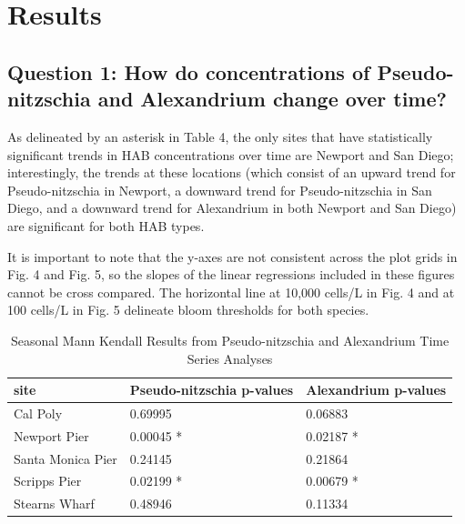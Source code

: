 \documentclass[
  12pt,
]{article}
\begin{document}
\newpage

\hypertarget{results}{%
\section{Results}\label{results}}

\hypertarget{question-1-how-do-concentrations-of-pseudo-nitzschia-and-alexandrium-change-over-time}{%
\subsection{Question 1: How do concentrations of Pseudo-nitzschia and
Alexandrium change over
time?}\label{question-1-how-do-concentrations-of-pseudo-nitzschia-and-alexandrium-change-over-time}}

As delineated by an asterisk in Table 4, the only sites that have
statistically significant trends in HAB concentrations over time are
Newport and San Diego; interestingly, the trends at these locations
(which consist of an upward trend for Pseudo-nitzschia in Newport, a
downward trend for Pseudo-nitzschia in San Diego, and a downward trend
for Alexandrium in both Newport and San Diego) are significant for both
HAB types.

It is important to note that the y-axes are not consistent across the
plot grids in Fig. 4 and Fig. 5, so the slopes of the linear regressions
included in these figures cannot be cross compared. The horizontal line
at 10,000 cells/L in Fig. 4 and at 100 cells/L in Fig. 5 delineate bloom
thresholds for both species.

\begin{longtable}[t]{lll}
\caption{\label{tab:Table 4}Seasonal Mann Kendall Results from Pseudo-nitzschia and Alexandrium Time Series Analyses}\\
\toprule
site & Pseudo-nitzschia p-values & Alexandrium p-values\\
\midrule
Cal Poly & 0.69995 & 0.06883\\
Newport Pier & 0.00045 * & 0.02187 *\\
Santa Monica Pier & 0.24145 & 0.21864\\
Scripps Pier & 0.02199 * & 0.00679 *\\
Stearns Wharf & 0.48946 & 0.11334\\
\bottomrule
\end{longtable}
\end{document}
